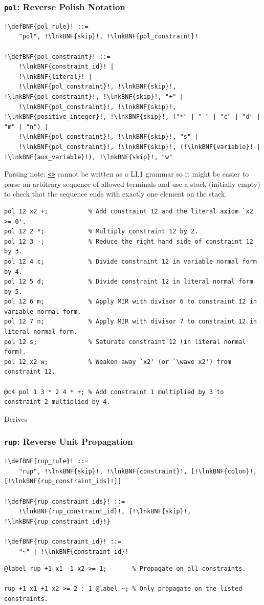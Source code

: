 \documentclass[a4paper]{article}
\newcommand{\defBNF}[1]{\hypertarget{def:#1}{<\detokenize{#1}>}}
\newcommand{\lnkBNF}[1]{\hyperlink{def:#1}{<\detokenize{#1}>}}
\newcommand{\wave}[0]{\raisebox{0.5ex}{\texttildelow}}
\begin{document}
\subsubsection{\texttt{pol}: Reverse Polish Notation}\label{sec:rules-pol}
\begin{lstlisting}
!\defBNF{pol_rule}! ::=
	"pol", !\lnkBNF{skip}!, !\lnkBNF{pol_constraint}!

!\defBNF{pol_constraint}! ::=
	!\lnkBNF{constraint_id}! |
	!\lnkBNF{literal}! |
	!\lnkBNF{pol_constraint}!, !\lnkBNF{skip}!, !\lnkBNF{pol_constraint}!, !\lnkBNF{skip}!, "+" |
	!\lnkBNF{pol_constraint}!, !\lnkBNF{skip}!, !\lnkBNF{positive_integer}!, !\lnkBNF{skip}!, ("*" | "-" | "c" | "d" | "m" | "n") |
	!\lnkBNF{pol_constraint}!, !\lnkBNF{skip}!, "s" |
	!\lnkBNF{pol_constraint}!, !\lnkBNF{skip}!, (!\lnkBNF{variable}! | !\lnkBNF{aux_variable}!), !\lnkBNF{skip}!, "w"
\end{lstlisting}
Parsing note: \texttt{\lnkBNF{pol_constraint}} cannot be written as a LL1 grammar so it might be easier to parse an arbitrary sequence of allowed terminals and use a stack (initially empty) to check that the sequence ends with exactly one element on the stack.
\begin{lstlisting}[language=veripb]
pol 12 x2 +;           % Add constraint 12 and the literal axiom `x2 >= 0'.
pol 12 2 *;            % Multiply constraint 12 by 2.
pol 12 3 -;            % Reduce the right hand side of constraint 12 by 3.
pol 12 4 c;            % Divide constraint 12 in variable normal form by 4.
pol 12 5 d;            % Divide constraint 12 in literal normal form by 5.
pol 12 6 m;            % Apply MIR with divisor 6 to constraint 12 in variable normal form.
pol 12 7 n;            % Apply MIR with divisor 7 to constraint 12 in literal normal form.
pol 12 s;              % Saturate constraint 12 (in literal normal form).
pol 12 x2 w;           % Weaken away `x2' (or `\wave x2') from constraint 12.

@c4 pol 1 3 * 2 4 * +; % Add constraint 1 multiplied by 3 to constraint 2 multiplied by 4.
\end{lstlisting}
Derives

\subsubsection{\texttt{rup}: Reverse Unit Propagation}\label{sec:rules-rup}
\begin{lstlisting}
!\defBNF{rup_rule}! ::=
	"rup", !\lnkBNF{skip}!, !\lnkBNF{constraint}!, [!\lnkBNF{colon}!, [!\lnkBNF{rup_constraint_ids}!]]

!\defBNF{rup_constraint_ids}! ::=
	!\lnkBNF{rup_constraint_id}!, {!\lnkBNF{skip}!, !\lnkBNF{rup_constraint_id}!}

!\defBNF{rup_constraint_id}! ::=
	"~" | !\lnkBNF{constraint_id}!
\end{lstlisting}
\begin{lstlisting}[language=veripb]
@label rup +1 x1 -1 x2 >= 1;       % Propagate on all constraints.

rup +1 x1 +1 x2 >= 2 : 1 @label ~; % Only propagate on the listed constraints.
\end{lstlisting}
\end{document}
